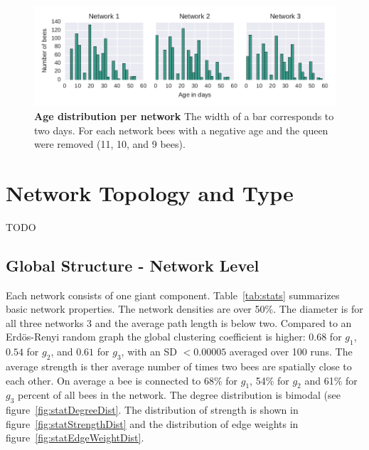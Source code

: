 \begin{figure}[htb]
	\centering
	\includegraphics[width=1.0\textwidth]{Figures/ages}
	\caption[Age distribution per network]{\textbf{Age distribution per network} The width of a bar corresponds to two days. For each network bees with a negative age and the queen were removed (11, 10, and 9 bees).}
	\label{fig:ages}
\end{figure}

\section{Network Topology and Type }
TODO
\subsection{Global Structure - Network Level}
Each network consists of one giant component. Table~\ref{tab:stats} summarizes basic network properties. The network densities are over 50\%. The diameter is for all three networks 3 and the average path length is below two. Compared to an Erdös-Renyi random graph the global clustering coefficient is higher: $0.68$ for $g_1$, $0.54$ for $g_2$, and $0.61$ for $g_3$, with an SD $<0.00005$ averaged over 100 runs. The average strength is ther average number of times two bees are spatially close to each other. On average a bee is connected to 68\% for $g_1$, 54\% for $g_2$ and 61\% for $g_3$ percent of all bees in the network. The degree distribution is bimodal (see figure~\ref{fig:statDegreeDist}. The distribution of strength is shown in figure~\ref{fig:statStrengthDist} and the distribution of edge weights in figure~\ref{fig:statEdgeWeightDist}.



